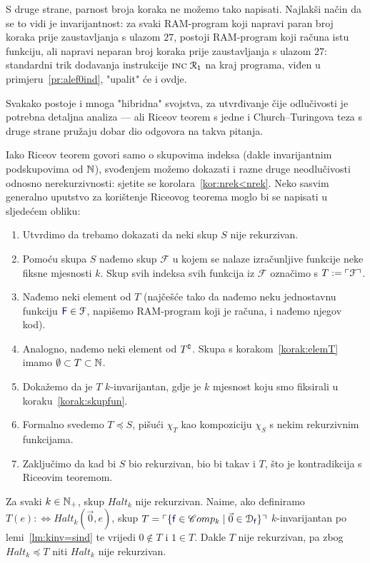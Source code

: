 S druge strane, parnost broja koraka ne možemo tako napisati. Najlakši način da se to vidi je invarijantnost: za svaki RAM-program koji napravi paran broj koraka prije zaustavljanja s ulazom $27$, postoji RAM-program koji računa istu funkciju, ali napravi neparan broj koraka prije zaustavljanja s ulazom $27$: standardni trik dodavanja instrukcije $\textsc{inc}\;\mathcal R_{1}$ na kraj programa, viđen u primjeru~\ref{pr:alef0ind}, "upalit" će i ovdje.

Svakako postoje i mnoga "hibridna" svojstva, za utvrđivanje čije odlučivosti je potrebna detaljna analiza --- ali Riceov teorem s jedne i Church--\!Turingova teza s druge strane pružaju dobar dio odgovora na takva pitanja.

Iako Riceov teorem govori samo o skupovima indeksa (dakle invarijantnim podskupovima od ${\mathbb N}$), svođenjem možemo dokazati i razne druge neodlučivosti odnosno nerekurzivnosti: sjetite se korolara~\ref{kor:nrek<nrek}. Neko sasvim generalno uputstvo za korištenje Riceovog teorema moglo bi se napisati u sljedećem obliku:

\begin{enumerate}
    \item Utvrdimo da trebamo dokazati da neki skup $S$ nije rekurzivan.
    \item\label{korak:skupfun} Pomoću skupa $S$ nađemo skup $\mathcal F$ u kojem se nalaze izračunljive funkcije neke fiksne mjesnosti $k$.
    Skup svih indeksa svih funkcija iz $\mathcal F$ označimo s $T:=\ulcorner\mathcal F\urcorner$.
    \item\label{korak:elemT} Nađemo neki element od $T$ (najčešće tako da nađemo neku jednostavnu funkciju $\f F\in\mathcal F$, napišemo RAM-program koji je računa, i nađemo njegov kod).
    \item Analogno, nađemo neki element od $T\sp{{\scriptscriptstyle\complement}}$. Skupa s korakom~\ref{korak:elemT} imamo $\emptyset\subset T\subset{\mathbb N}$.
    \item Dokažemo da je $T$ $k$-invarijantan, gdje je $k$ mjesnost koju smo fiksirali u koraku~\ref{korak:skupfun}.
    \item Formalno svedemo $T\!\preceq S$, pišući $\chi_T$ kao kompoziciju $\chi_S$ s nekim rekurzivnim funkcijama.
    \item Zaključimo da kad bi $S$ bio rekurzivan, bio bi takav i $T$, što je kontradikcija s Riceovim teoremom.
\end{enumerate}

\begin{primjer}[{name=[neodlučivost $k$-mjesnog brojevnog problema zaustavljanja]}]
    Za svaki $k\in{\mathbb N}_+$, skup $Halt_k$ nije rekurzivan. Naime, ako definiramo $T(e):\Longleftrightarrow Halt_k(\vec 0,e)$, skup $T=\kins{\{\f f\in\mathscr Comp_k\mid\vec 0\in\dom{\f f}\}}$ $k$-invarijantan po lemi~\ref{lm:kinv=sind} te vrijedi $0\notin T$ i $1\in T$. Dakle $T$ nije rekurzivan, pa zbog $Halt_k\preceq T$ niti $Halt_k$ nije rekurzivan.
\end{primjer}
